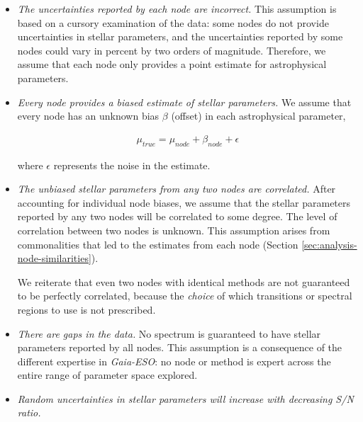\documentclass[preprint]{aastex}
\newcommand{\project}[1]{\textsl{#1}}
\newcommand{\gaiaeso}{\project{Gaia-ESO}}
\begin{document}
\begin{itemize}
    \item   \emph{The uncertainties reported by each node are incorrect.}
            This assumption is based on a cursory examination of the data:
            some nodes do not provide uncertainties in stellar parameters, and
            the uncertainties reported by some nodes could vary in percent by
            two orders of magnitude. Therefore, we assume that each node only
            provides a point estimate for astrophysical parameters.

    \item   \emph{Every node provides a biased estimate of stellar parameters.}
            We assume that every node has an unknown bias $\beta$ (offset) in each
            astrophysical parameter, 

            \begin{eqnarray}
                \mu_{true} = \mu_{node} + \beta_{node} + \epsilon
            \end{eqnarray}

            \noindent{}where $\epsilon$ represents the noise in the estimate.

    \item   \emph{The unbiased stellar parameters from any two nodes are correlated.}
            After accounting for individual node biases, we assume that the 
            stellar parameters reported by any two nodes will be correlated
            to some degree. The level of correlation between two nodes is unknown.
            This assumption arises from commonalities that led to the estimates from
            each node (Section \ref{sec:analysis-node-similarities}).
            
            We reiterate that even two nodes with identical methods are not guaranteed
            to be perfectly correlated, because the \emph{choice} of which transitions
            or spectral regions to use is not prescribed.

    \item   \emph{There are gaps in the data.} 
            No spectrum is guaranteed to have stellar parameters reported by all
            nodes. This assumption is a consequence of the different expertise in
            \gaiaeso: no node or method is expert across the entire range of parameter
            space explored. 
            
    \item   \emph{Random uncertainties in stellar parameters will increase with
            decreasing S/N ratio.} 


\end{itemize}
\end{document}
